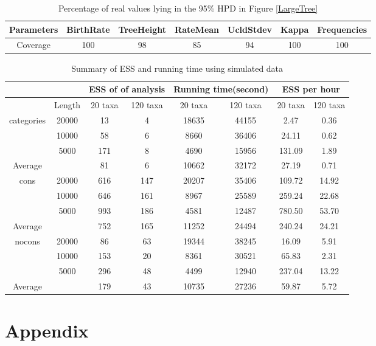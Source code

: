 \documentclass{bmcart}
\begin{document}
\begin{backmatter}
\begin{table}[h!]
  \centering
\begin{tabular}{c|cccccc}
\hline
Parameters&BirthRate&TreeHeight&RateMean&UcldStdev&Kappa&Frequencies\\
\hline
Coverage&100&98&85&94&100&100\\
\hline
\end{tabular}
\caption{Percentage of real values lying in the 95\% HPD in Figure \ref{LargeTree} }\label{num_hpd}
\end{table}

\begin{table}[h!]
  \centering
\begin{tabular}{cc|cc|cc|cc}
\hline
&&\multicolumn{2}{c|}{ESS of of analysis}&\multicolumn{2}{c|}{Running time(second)}&\multicolumn{2}{c}{ESS per hour}\\
\hline
&Length&20 taxa&120 taxa&20 taxa&120 taxa&20 taxa&120 taxa\\
categories&20000&13&4&18635&44155&2.47&0.36\\
&10000&58&6&8660&36406&24.11&0.62\\
&5000&171&8&4690&15956&131.09&1.89\\
Average&&81&6&10662&32172&27.19&0.71\\
\hline
cons&20000&616&147&20207&35406&109.72&14.92\\
&10000&646&161&8967&25589&259.24&22.68\\
&5000&993&186&4581&12487&780.50&53.70\\
Average&&752&165&11252&24494&240.24&24.21\\
\hline
nocons&20000&86&63&19344&38245&16.09&5.91\\
&10000&153&20&8361&30521&65.83&2.31\\
&5000&296&48&4499&12940&237.04&13.22\\
Average&&179&43&10735&27236&59.87&5.72\\
\hline
\end{tabular}
\caption{Summary of ESS and running time using simulated data}\label{eff_comp1}
\end{table}
\clearpage
\newpage
\section*{Appendix}

\end{backmatter}
\end{document}

